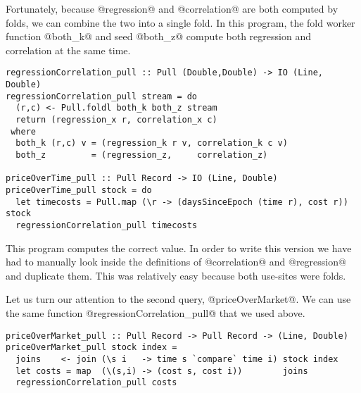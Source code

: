 Fortunately, because @regression@ and @correlation@ are both computed by folds, we can combine the two into a single fold.
In this program, the fold worker function @both_k@ and seed @both_z@ compute both regression and correlation at the same time.

\begin{lstlisting}
regressionCorrelation_pull :: Pull (Double,Double) -> IO (Line, Double)
regressionCorrelation_pull stream = do
  (r,c) <- Pull.foldl both_k both_z stream
  return (regression_x r, correlation_x c)
 where
  both_k (r,c) v = (regression_k r v, correlation_k c v)
  both_z         = (regression_z,     correlation_z)

priceOverTime_pull :: Pull Record -> IO (Line, Double)
priceOverTime_pull stock = do
  let timecosts = Pull.map (\r -> (daysSinceEpoch (time r), cost r)) stock
  regressionCorrelation_pull timecosts
\end{lstlisting}


This program computes the correct value.
In order to write this version we have had to manually look inside the definitions of @correlation@ and @regression@ and duplicate them.
This was relatively easy because both use-sites were folds.


Let us turn our attention to the second query, @priceOverMarket@.
We can use the same function @regressionCorrelation_pull@ that we used above.

\begin{lstlisting}
priceOverMarket_pull :: Pull Record -> Pull Record -> (Line, Double)
priceOverMarket_pull stock index =
  joins    <- join (\s i   -> time s `compare` time i) stock index
  let costs = map  (\(s,i) -> (cost s, cost i))        joins
  regressionCorrelation_pull costs
\end{lstlisting}


